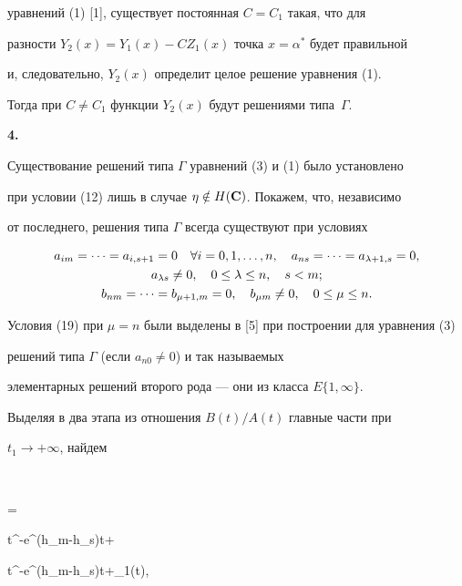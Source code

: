 уравнений (1) [1], существует постоянная $C=C_1$ такая, что для


разности $Y_2(x)=Y_1(x)-CZ_1(x)$ точка $x=\alpha^*$ будет правильной


и, следовательно, $Y_2(x)$ определит целое решение уравнения (1).


Тогда при $C\ne C_1$ функции $Y_2(x)$ будут решениями типа~$\Gamma$.


\medskip





{\bf 4.}


Существование решений типа $\Gamma$ уравнений (3) и (1) было установлено


при условии (12) лишь в случае $\eta\notin H(\bold C)$. Покажем, что, независимо


от последнего, решения типа $\Gamma$ всегда существуют при условиях


\begin{gather}


a_{im}=\dotsb=a_{i,s+1}=0 \quad \forall i=0,1,\dotsc,n, \quad


a_{ns}=\dotsb=a_{\lambda+1,s}=0,\notag \\


a_{\lambda s}\ne 0,\quad 0\le\lambda\le n, \quad s<m; \\


b_{nm}=\dotsb=b_{\mu+1,m}=0, \quad b_{\mu m}\ne 0, \quad 0\le\mu\le n.\notag


\end{gather}





Условия (19) при $\mu=n$ были выделены в [5] при построении для уравнения (3)


решений типа $\Gamma$ (если $a_{n0}\ne 0$) и так называемых


элементарных решений второго рода --- они из класса $E\{1,\infty\}$.





Выделяя в два этапа из отношения $B(t)/A(t)$ главные части при


$t_1\to +\infty$, найдем


$$


=


t^{\mu-\lambda}e^{(h_m-h_s)t}+


t^{\mu-}e^{(h_m-h_s)t}+\alpha_1(t),


